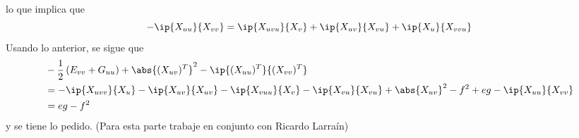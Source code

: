 \documentclass{article}
\begin{document}
\begin{enumerate}
\begin{align*}
    \end{align*}
    lo que implica que
    \begin{equation*}
        -\ip{X_{uu}}{X_{vv}}=\ip{X_{uvu}}{X_{v}}+\ip{X_{uv}}{X_{vu}}+\ip{X_{u}}{X_{vvu}}
    \end{equation*}
    Usando lo anterior, se sigue que
    \begin{align*}
        & -\frac{1}{2}\left(E_{vv}+G_{uu}\right)+\abs{(X_{uv})^{T}}^{2}-\ip{(X_{uu})^{T}}
        {(X_{vv})^{T}} \\
        &= -\ip{X_{uvv}}{X_{u}}-\ip{X_{uv}}{X_{uv}}-\ip{X_{vuu}}{X_{v}}-\ip{X_{vu}}{X_{vu}}
        +\abs{X_{uv}}^{2}-f^{2}+eg-\ip{X_{uu}}{X_{vv}} \\
        &= eg-f^{2}
    \end{align*}
    y se tiene lo pedido. (Para esta parte trabaje en conjunto con Ricardo Larraín)


\end{enumerate}
\end{document}
